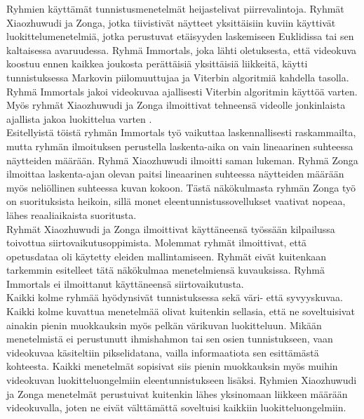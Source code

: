 Ryhmien käyttämät tunnistusmenetelmät heijastelivat piirrevalintoja. Ryhmät Xiaozhuwudi ja Zonga, jotka tiivistivät näytteet 
yksittäisiin kuviin käyttivät luokittelumenetelmiä, jotka perustuvat etäisyyden laskemiseen 
Euklidissa tai sen kaltaisessa avaruudessa. Ryhmä Immortals, joka lähti oletuksesta, että videokuva koostuu ennen kaikkea joukosta perättäisiä 
yksittäisiä liikkeitä, käytti tunnistuksessa Markovin piilomuuttujaa ja Viterbin algoritmiä kahdella tasolla. Ryhmä Immortals jakoi videokuvaa 
ajallisesti Viterbin algoritmin käyttöä varten. Myös ryhmät Xiaozhuwudi ja Zonga ilmoittivat tehneensä videolle 
jonkinlaista ajallista jakoa luokittelua varten \citep{firstround}. \\

Esitellyistä töistä ryhmän Immortals työ vaikuttaa laskennallisesti raskammailta, mutta ryhmän ilmoituksen perustella laskenta-aika on vain lineaarinen suhteessa 
näytteiden määrään. Ryhmä Xiaozhuwudi ilmoitti saman lukeman. Ryhmä Zonga ilmoittaa laskenta-ajan olevan paitsi lineaarinen suhteessa näytteiden määrään myös
neliöllinen suhteessa kuvan kokoon. \citep{firstround} Tästä näkökulmasta ryhmän Zonga työ on suorituksista heikoin, sillä monet eleentunnistussovellukset vaativat 
nopeaa, lähes reaaliaikaista suoritusta. \\

Ryhmät Xiaozhuwudi ja Zonga ilmoittivat käyttäneensä työssään kilpailussa toivottua siirtovaikutusoppimista. Molemmat ryhmät ilmoittivat,
että opetusdataa oli käytetty eleiden mallintamiseen. Ryhmät eivät kuitenkaan tarkemmin esitelleet tätä näkökulmaa menetelmiensä kuvauksissa.
Ryhmä Immortals ei ilmoittanut käyttäneensä siirtovaikutusta. \citep{firstround}\\

Kaikki kolme ryhmää hyödynsivät tunnistuksessa sekä väri- että syvyyskuvaa. Kaikki kolme kuvattua menetelmää olivat kuitenkin sellasia, 
että ne soveltuisivat ainakin pienin muokkauksin myös pelkän värikuvan luokitteluun. Mikään menetelmistä ei perustunutt ihmishahmon 
tai sen osien tunnistukseen, vaan videokuvaa käsiteltiin pikselidatana, vailla informaatiota sen esittämästä kohteesta.
Kaikki menetelmät sopisivat siis  pienin muokkauksin myös muihin videokuvan luokitteluongelmiin eleentunnistukseen lisäksi. Ryhmien Xiaozhuwudi ja Zonga 
menetelmät perustuivat kuitenkin lähes yksinomaan liikkeen määrään videokuvalla, joten ne eivät välttämättä soveltuisi 
kaikkiin luokitteluongelmiin.\\

